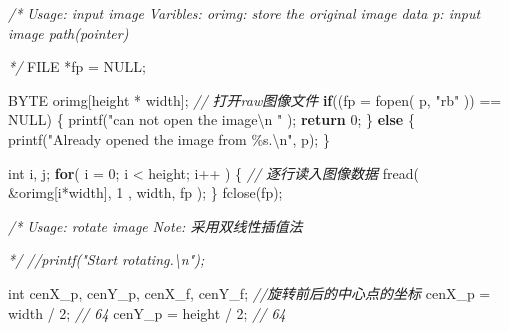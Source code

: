 \documentclass[
]{article}
\newenvironment{Shaded}{}{}
\newcommand{\CommentTok}[1]{\textcolor[rgb]{0.38,0.63,0.69}{\textit{#1}}}
\newcommand{\ControlFlowTok}[1]{\textcolor[rgb]{0.00,0.44,0.13}{\textbf{#1}}}
\newcommand{\DataTypeTok}[1]{\textcolor[rgb]{0.56,0.13,0.00}{#1}}
\newcommand{\DecValTok}[1]{\textcolor[rgb]{0.25,0.63,0.44}{#1}}
\newcommand{\NormalTok}[1]{#1}
\newcommand{\OperatorTok}[1]{\textcolor[rgb]{0.40,0.40,0.40}{#1}}
\newcommand{\SpecialCharTok}[1]{\textcolor[rgb]{0.25,0.44,0.63}{#1}}
\newcommand{\StringTok}[1]{\textcolor[rgb]{0.25,0.44,0.63}{#1}}
\begin{document}
\begin{Shaded}
\begin{Highlighting}[]
    \CommentTok{/*}
\CommentTok{    Usage: input image}
\CommentTok{    Varibles:   orimg:  store the original image data}
\CommentTok{                p:      input image path(pointer) }

\CommentTok{     */}
    \DataTypeTok{FILE} \OperatorTok{*}\NormalTok{fp }\OperatorTok{=}\NormalTok{ NULL}\OperatorTok{;}  
  
\NormalTok{    BYTE orimg}\OperatorTok{[}\NormalTok{height }\OperatorTok{*}\NormalTok{ width}\OperatorTok{];}
    \CommentTok{// 打开raw图像文件  }
    \ControlFlowTok{if}\OperatorTok{((}\NormalTok{fp }\OperatorTok{=}\NormalTok{ fopen}\OperatorTok{(}\NormalTok{ p}\OperatorTok{,} \StringTok{"rb"} \OperatorTok{))} \OperatorTok{==}\NormalTok{ NULL}\OperatorTok{)} \OperatorTok{\{}  
\NormalTok{        printf}\OperatorTok{(}\StringTok{"can not open the image}\SpecialCharTok{\textbackslash{}n}\StringTok{ "} \OperatorTok{);}  
        \ControlFlowTok{return} \DecValTok{0}\OperatorTok{;}  
    \OperatorTok{\}} \ControlFlowTok{else} \OperatorTok{\{}  
\NormalTok{        printf}\OperatorTok{(}\StringTok{"Already opened the image from \%s.}\SpecialCharTok{\textbackslash{}n}\StringTok{"}\OperatorTok{,}\NormalTok{ p}\OperatorTok{);}  
    \OperatorTok{\}} 

    \DataTypeTok{int}\NormalTok{ i}\OperatorTok{,}\NormalTok{ j}\OperatorTok{;}
    \ControlFlowTok{for}\OperatorTok{(}\NormalTok{ i }\OperatorTok{=} \DecValTok{0}\OperatorTok{;}\NormalTok{ i }\OperatorTok{\textless{}}\NormalTok{ height}\OperatorTok{;}\NormalTok{ i}\OperatorTok{++} \OperatorTok{)} \OperatorTok{\{}  
        \CommentTok{// 逐行读入图像数据}
\NormalTok{        fread}\OperatorTok{(} \OperatorTok{\&}\NormalTok{orimg}\OperatorTok{[}\NormalTok{i}\OperatorTok{*}\NormalTok{width}\OperatorTok{],} \DecValTok{1} \OperatorTok{,}\NormalTok{ width}\OperatorTok{,}\NormalTok{ fp }\OperatorTok{);} 
    \OperatorTok{\}}
\NormalTok{    fclose}\OperatorTok{(}\NormalTok{fp}\OperatorTok{);}

    \CommentTok{/*}
\CommentTok{    Usage:  rotate image}
\CommentTok{    Note:   采用双线性插值法}

\CommentTok{     */}
    \CommentTok{//printf("Start rotating.\textbackslash{}n");}

    \DataTypeTok{int}\NormalTok{ cenX\_p}\OperatorTok{,}\NormalTok{ cenY\_p}\OperatorTok{,}\NormalTok{ cenX\_f}\OperatorTok{,}\NormalTok{ cenY\_f}\OperatorTok{;}     \CommentTok{//旋转前后的中心点的坐标}
\NormalTok{    cenX\_p }\OperatorTok{=}\NormalTok{ width }\OperatorTok{/} \DecValTok{2}\OperatorTok{;}                     \CommentTok{// 64}
\NormalTok{    cenY\_p }\OperatorTok{=}\NormalTok{ height }\OperatorTok{/} \DecValTok{2}\OperatorTok{;}                    \CommentTok{// 64}


\end{Highlighting}
\end{Shaded}
\end{document}
